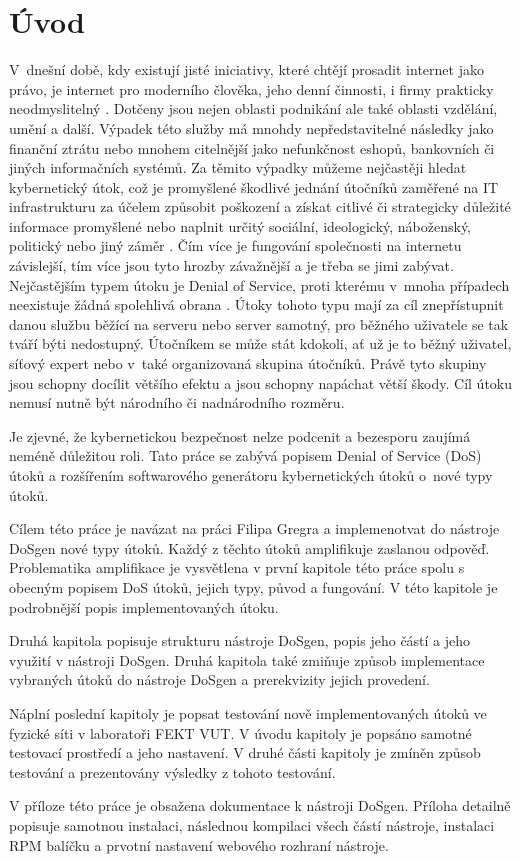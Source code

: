 \chapter*{Úvod}
{}


V~dnešní době, kdy existují jisté iniciativy, které chtějí prosadit internet jako právo, je internet 
pro moderního člověka, jeho denní činnosti, i firmy prakticky neodmyslitelný \cite{pirati_internet}. 
Dotčeny jsou nejen oblasti podnikání ale také oblasti vzdělání, umění a další. Výpadek této služby má 
mnohdy nepředstavitelné následky jako finanční ztrátu nebo mnohem citelnější jako nefunkčnost eshopů, 
bankovních či jiných informačních systémů. Za těmito výpadky můžeme nejčastěji hledat kybernetický útok, 
což je promyšlené škodlivé jednání útočníků zaměřené na  IT  infrastrukturu  za  účelem  způsobit 
poškození  a  získat  citlivé  či  strategicky  důležité 
informace promyšlené nebo naplnit určitý sociální, ideologický, náboženský, politický nebo jiný záměr 
\cite{Jirasek2012}. Čím více je fungování společnosti na internetu závislejší, tím více jsou tyto hrozby 
závažnější a je třeba se jimi zabývat. Nejčastějším typem útoku je Denial of Service, proti kterému 
v~mnoha případech neexistuje  žádná spolehlivá obrana \cite{akamai_q2_2017}. Útoky tohoto typu mají 
za cíl znepřístupnit danou službu běžící na serveru nebo server samotný, pro běžného uživatele se tak 
tváří býti nedostupný. Útočníkem se může stát kdokoli, ať už je to běžný uživatel, síťový expert nebo 
v~také organizovaná skupina útočníků. Právě tyto skupiny jsou schopny docílit většího efektu a jsou 
schopny napáchat větší škody. Cíl útoku nemusí nutně být národního či nadnárodního rozměru.

Je zjevné, že kybernetickou bezpečnost nelze podcenit a bezesporu zaujímá neméně důležitou roli. Tato 
práce se zabývá popisem Denial of Service (DoS) útoků a rozšířením softwarového generátoru kybernetických útoků 
o~nové typy útoků.

Cílem této práce je navázat na práci Filipa Gregra a implemenotvat do nástroje DoSgen nové typy útoků. Každý z těchto útoků amplifikuje zaslanou odpověď. Problematika amplifikace je vysvětlena v první kapitole této práce spolu s obecným popisem DoS útoků, jejich typy, původ a fungování. V této kapitole je podrobnější popis implementovaných útoku. 

Druhá kapitola popisuje strukturu nástroje DoSgen, popis jeho částí a jeho využití v nástroji DoSgen. Druhá kapitola také zmiňuje způsob implementace vybraných útoků do nástroje DoSgen a prerekvizity jejich provedení.

Náplní poslední kapitoly je popsat testování nově implementovaných útoků ve fyzické síti v laboratoři FEKT VUT. V úvodu kapitoly je popsáno samotné testovací prostředí a jeho nastavení. V druhé části kapitoly je zmíněn způsob testování a prezentovány výsledky z tohoto testování.

V příloze této práce je obsažena dokumentace k nástroji DoSgen. Příloha detailně popisuje samotnou instalaci, následnou kompilaci všech částí nástroje, instalaci RPM balíčku a prvotní nastavení webového rozhraní nástroje.